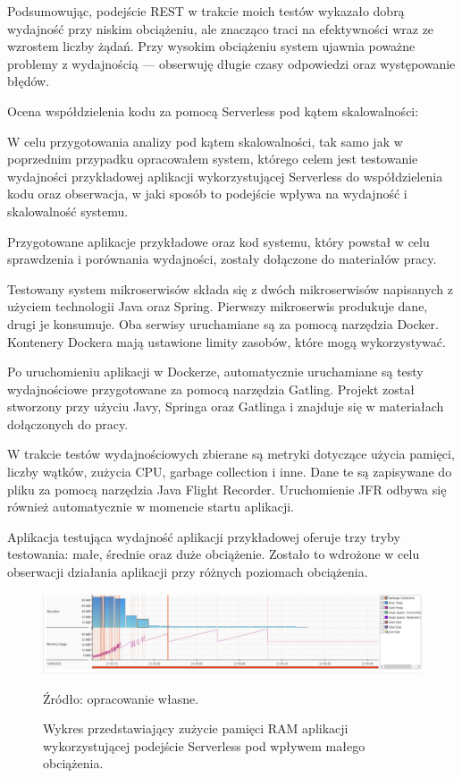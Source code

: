 \documentclass[runningheads,12pt]{llncs}
\begin{document}
Podsumowując, podejście REST w trakcie moich testów wykazało dobrą wydajność przy niskim obciążeniu, ale znacząco traci na efektywności wraz ze wzrostem liczby żądań. Przy wysokim obciążeniu system ujawnia poważne problemy z wydajnością — obserwuję długie czasy odpowiedzi oraz występowanie błędów.

\newpage



Ocena współdzielenia kodu za pomocą Serverless pod kątem skalowalności:

W celu przygotowania analizy pod kątem skalowalności, tak samo jak w poprzednim przypadku opracowałem system, którego celem jest testowanie wydajności przykładowej aplikacji wykorzystującej Serverless do współdzielenia kodu oraz obserwacja, w jaki sposób to podejście wpływa na wydajność i skalowalność systemu.

Przygotowane aplikacje przykładowe oraz kod systemu, który powstał w celu sprawdzenia i porównania wydajności, zostały dołączone do materiałów pracy.

Testowany system mikroserwisów składa się z dwóch mikroserwisów napisanych z użyciem technologii Java oraz Spring. Pierwszy mikroserwis produkuje dane, drugi je konsumuje. Oba serwisy uruchamiane są za pomocą narzędzia Docker. Kontenery Dockera mają ustawione limity zasobów, które mogą wykorzystywać.

Po uruchomieniu aplikacji w Dockerze, automatycznie uruchamiane są testy wydajnościowe przygotowane za pomocą narzędzia Gatling. Projekt został stworzony przy użyciu Javy, Springa oraz Gatlinga i znajduje się w materiałach dołączonych do pracy.

W trakcie testów wydajnościowych zbierane są metryki dotyczące użycia pamięci, liczby wątków, zużycia CPU, garbage collection i inne. Dane te są zapisywane do pliku za pomocą narzędzia Java Flight Recorder. Uruchomienie JFR odbywa się również automatycznie w momencie startu aplikacji.

Aplikacja testująca wydajność aplikacji przykładowej oferuje trzy tryby testowania: małe, średnie oraz duże obciążenie. Zostało to wdrożone w celu obserwacji działania aplikacji przy różnych poziomach obciążenia.

\newpage

\begin{figure}
    \includegraphics[width=\linewidth]{images/serverless-memory-low-graph.jpg}
    \caption{Wykres przedstawiający zużycie pamięci RAM aplikacji wykorzystującej podejście Serverless pod wpływem małego obciążenia.} \label{fig1}
    \vspace{0.5em}
    {\small Źródło: opracowanie własne.}
\end{figure}
\end{document}
